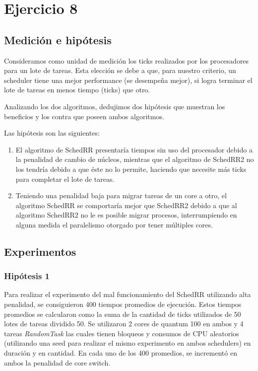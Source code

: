 \documentclass[a4paper,10pt,twoside]{article}
\begin{document}


\section{Ejercicio 8}

\subsection{Medición e hipótesis}
Consideramos como unidad de medición los ticks realizados por los procesadores para un lote de tareas. Esta elección se debe a que, para nuestro criterio, un scheduler tiene una mejor performance (se desempeña mejor), si logra terminar el lote de tareas en menos tiempo (ticks) que otro.

Analizando los dos algoritmos, dedujimos dos hipótesis que muestran los beneficios y los contra que poseen ambos algoritmos.

Las hipótesis son las siguientes:
\begin{enumerate}
\item El algoritmo de SchedRR presentaría tiempos sin uso del procesador debido a la penalidad de cambio de núcleos, mientras que el algoritmo de SchedRR2 no los tendría debido a que éste no lo permite, haciendo que necesite más ticks para completar el lote de tareas.

\item Teniendo una penalidad baja para migrar tareas de un core a otro,  el algoritmo SchedRR se comportaría mejor que SchedRR2 debido a que al algoritmo SchedRR2 no le es posible migrar procesos, interrumpiendo en alguna medida el paralelismo otorgado por tener múltiples cores.
\end{enumerate}

\subsection{Experimentos}
\subsubsection{Hipótesis 1}

Para realizar el experimento del mal funcionamiento del SchedRR utilizando alta penalidad, se consiguieron 400 tiempos promedios de ejecución. Estos tiempos promedios se calcularon como la suma de la cantidad de ticks utilizados de 50 lotes de tareas dividido 50. Se utilizaron 2 cores de quantum 100 en ambos y 4 tareas \textit{RandomTask} las cuales tienen bloqueos y consumos de CPU aleatorios (utilizando una seed para realizar el mismo experimento en ambos schedulers) en duración y en cantidad. En cada uno de los 400 promedios, se incrementó en ambos la penalidad de core switch.
\end{document}
